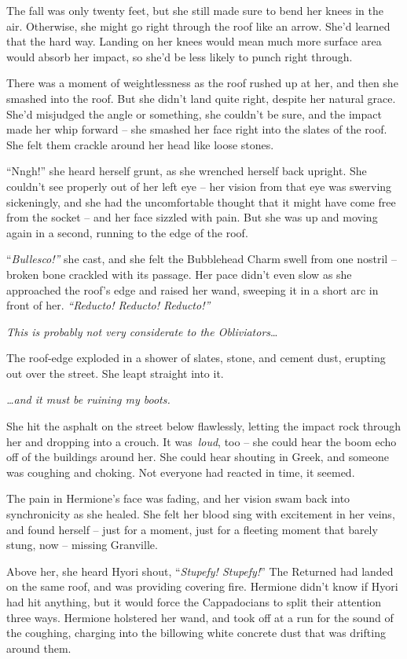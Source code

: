 The fall was only twenty feet, but she still made sure to bend her knees
in the air. Otherwise, she might go right through the roof like an
arrow. She'd learned that the hard way. Landing on her knees would mean
much more surface area would absorb her impact, so she'd be less likely
to punch right through.

There was a moment of weightlessness as the roof rushed up at her, and
then she smashed into the roof. But she didn't land quite right, despite
her natural grace. She'd misjudged the angle or something, she couldn't
be sure, and the impact made her whip forward -- she smashed her face
right into the slates of the roof. She felt them crackle around her head
like loose stones.

``Nngh!'' she heard herself grunt, as she wrenched herself back upright.
She couldn't see properly out of her left eye -- her vision from that
eye was swerving sickeningly, and she had the uncomfortable thought that
it might have come free from the socket -- and her face sizzled with
pain. But she was up and moving again in a second, running to the edge
of the roof.

``\emph{Bullesco!''} she cast, and she felt the Bubblehead Charm swell
from one nostril -- broken bone crackled with its passage. Her pace
didn't even slow as she approached the roof's edge and raised her wand,
sweeping it in a short arc in front of her. \emph{``Reducto! Reducto!
Reducto!''}

\emph{This is probably not very considerate to the Obliviators}\ldots{}

The roof-edge exploded in a shower of slates, stone, and cement dust,
erupting out over the street. She leapt straight into it.

\emph{\ldots and it must be ruining my boots.}

She hit the asphalt on the street below flawlessly, letting the impact
rock through her and dropping into a crouch. It was~\emph{loud}, too --
she could hear the boom echo off of the buildings around her. She could
hear shouting in Greek, and someone was coughing and choking. Not
everyone had reacted in time, it seemed.

The pain in Hermione's face was fading, and her vision swam back into
synchronicity as she healed. She felt her blood sing with excitement in
her veins, and found herself -- just for a moment, just for a fleeting
moment that barely stung, now -- missing Granville.

Above her, she heard Hyori shout, ``\emph{Stupefy! Stupefy!}'' The
Returned had landed on the same roof, and was providing covering fire.
Hermione didn't know if Hyori had hit anything, but it would force the
Cappadocians to split their attention three ways. Hermione holstered her
wand, and took off at a run for the sound of the coughing, charging into
the billowing white concrete dust that was drifting around them.

